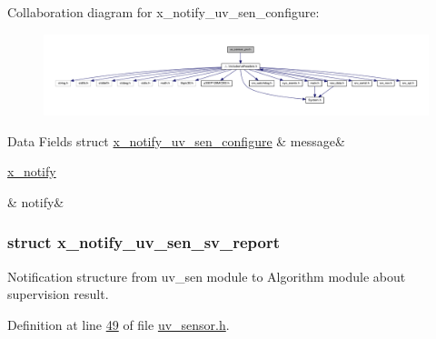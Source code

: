 Collaboration diagram for x\+\_\+notify\+\_\+uv\+\_\+sen\+\_\+configure\+:\nopagebreak
\begin{figure}[H]
\begin{center}
\leavevmode
\includegraphics[width=350pt]{dc/d3e/a01712}
\end{center}
\end{figure}
\begin{DoxyFields}{Data Fields}
\hypertarget{a00020_a1497b20cf78cad9e85b8ed48a9aa7bd2}{struct \hyperlink{a00020_d2/db8/a00867}{x\+\_\+notify\+\_\+uv\+\_\+sen\+\_\+configure}}\label{a00020_a1497b20cf78cad9e85b8ed48a9aa7bd2}
&
message&
\\
\hline

\hypertarget{a00020_a8e6a04c2283f9fd7b8dcbc62faba5847}{\hyperlink{a00036_df/d4c/a00851}{x\+\_\+notify}}\label{a00020_a8e6a04c2283f9fd7b8dcbc62faba5847}
&
notify&
\\
\hline

\end{DoxyFields}
\label{da/d5b/a00868}
\hypertarget{a00020_da/d5b/a00868}{}
\subsubsection{struct x\+\_\+notify\+\_\+uv\+\_\+sen\+\_\+sv\+\_\+report}
Notification structure from uv\+\_\+sen module to Algorithm module about supervision result. 

Definition at line \hyperlink{a00020_source_l00049}{49} of file \hyperlink{a00020_source}{uv\+\_\+sensor.\+h}.



